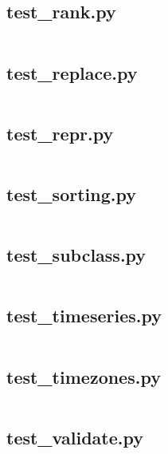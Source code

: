 \documentclass{article}
\begin{document}
\subsection{test\_rank.py}
\inputminted{python}{/home/dufferzafar/dev/@clones/pandas/pandas/tests/series/test_rank.py}
\newpage

\subsection{test\_replace.py}
\inputminted{python}{/home/dufferzafar/dev/@clones/pandas/pandas/tests/series/test_replace.py}
\newpage

\subsection{test\_repr.py}
\inputminted{python}{/home/dufferzafar/dev/@clones/pandas/pandas/tests/series/test_repr.py}
\newpage

\subsection{test\_sorting.py}
\inputminted{python}{/home/dufferzafar/dev/@clones/pandas/pandas/tests/series/test_sorting.py}
\newpage

\subsection{test\_subclass.py}
\inputminted{python}{/home/dufferzafar/dev/@clones/pandas/pandas/tests/series/test_subclass.py}
\newpage

\subsection{test\_timeseries.py}
\inputminted{python}{/home/dufferzafar/dev/@clones/pandas/pandas/tests/series/test_timeseries.py}
\newpage

\subsection{test\_timezones.py}
\inputminted{python}{/home/dufferzafar/dev/@clones/pandas/pandas/tests/series/test_timezones.py}
\newpage

\subsection{test\_validate.py}
\inputminted{python}{/home/dufferzafar/dev/@clones/pandas/pandas/tests/series/test_validate.py}
\newpage
\end{document}
